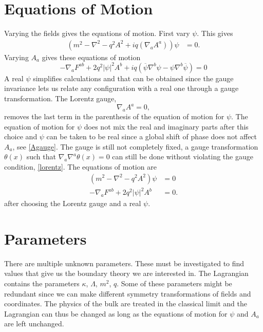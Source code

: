 \documentclass[12pt]{report}
\renewcommand{\i}{\ensuremath{i}}
\begin{document}
\section{Equations of Motion}
Varying the fields gives the equations of motion. First vary $\psi$. This gives
\begin{equation}
\begin{split}
\left(m^2-\nabla^2-q^2A^2+\i q(\nabla_aA^a)\right)\psi&=0.
\end{split}
\end{equation}
Varying $A_a$ gives these equations of motion
\begin{equation}
 -\nabla_aF^{ab}+2q^2|\psi|^2A^b+iq\left(\overline{\psi}\nabla^b\psi-\psi\nabla^b\overline{\psi}\right)=0
\end{equation}
A real $\psi$ simplifies calculations and that can be obtained since the gauge invariance lets us relate any configuration with a real one through a gauge transformation. The Lorentz gauge,
\begin{equation}
 \nabla_aA^a=0\label{lorentz},
\end{equation}
removes the last term in the parenthesis of the equation of motion for $\psi$. The equation of motion for $\psi$ does not mix the real and imaginary parts after this choice and $\psi$ can be taken to be real since a global shift of phase does not affect $A_a$, see \eqref{Agauge}. The gauge is still not completely fixed, a gauge transformation $\theta(x)$ such that $\nabla_a\nabla^a\theta(x)=0$ can still be done without violating the gauge condition, \eqref{lorentz}. The equations of motion are
\begin{equation}
\begin{split}
\left(m^2-\nabla^2-q^2A^2\right)\psi&=0\\
-\nabla_aF^{ab}+2q^2|\psi|^2A^b&=0.
\end{split}
\end{equation}
after choosing the Lorentz gauge and a real $\psi$.
\section{Parameters}
There are multiple unknown parameters. These must be investigated to find values that give us the boundary theory we are interested in. The Lagrangian contains the parameters $\kappa$, $\Lambda$, $m^2$, $q$. Some of these parameters might be redundant since we can make different symmetry transformations of fields and coordinates. The physics of the bulk are treated in the classical limit and the Lagrangian can thus be changed as long as the equations of motion for $\psi$ and $A_a$ are left unchanged.
\end{document}
